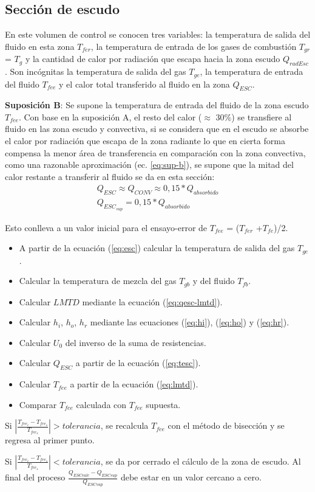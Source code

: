 \subsection{Sección de escudo}
\par En este volumen de control se conocen tres variables: la temperatura de salida del fluido en esta zona $T_{fer}$, la temperatura de entrada de los gases de combustión $T_{gr}$ = $T_g$ y la cantidad de calor por radiación que escapa hacia la zona escudo $Q_{radEsc}$. Son incógnitas la temperatura de salida del gas $T_{ge}$, la temperatura de entrada del fluido $T_{fee}$ y el calor total transferido al fluido en la zona $Q_{ESC}$.
\par \textbf{Suposición B}: Se supone la temperatura de entrada del fluido de la zona escudo $T_{fee}$. Con base en la suposición A, el resto del calor ($\approx$ 30\%) se transfiere al fluido en las zona escudo y convectiva, si se considera que en el escudo se absorbe el calor por radiación que escapa de la zona radiante lo que en cierta forma compensa la menor área de transferencia en comparación con la zona convectiva, como una razonable aproximación (ec. \ref{eq:sup-b}), se supone que la mitad del calor restante a transferir al fluido se da en esta sección:
\begin{equation}\label{eq:sup-b}\begin{gathered}
    Q_{ESC} \approx Q_{CONV} \approx 0,15 * Q_{absorbido}\\
    Q_{ESC_{sup}} = 0,15 * Q_{absorbido} 
\end{gathered}\end{equation}
\par Esto conlleva a un valor inicial para el ensayo-error de $T_{fee}$ = ($T_{fer}$ +$T_{fe}$)/2. 
\begin{itemize}
    \item A partir de la ecuación (\ref{eq:esc}) calcular la temperatura de salida del gas $T_{ge}$.
    \item Calcular la temperatura de mezcla del gas $T_{gb}$ y del fluido $T_{fb}$.
    \item Calcular $LMTD$ mediante la ecuación (\ref{eq:qesc-lmtd}).
    \item Calcular $h_i$, $h_o$, $h_r$ mediante las ecuaciones (\ref{eq:hi}), (\ref{eq:ho}) y (\ref{eq:hr}).
    \item Calcular $U_0$ del inverso de la suma de resistencias.
    \item Calcular $Q_{ESC}$ a partir de la ecuación (\ref{eq:tesc}).
    \item Calcular $T_{fee}$ a partir de la ecuación (\ref{eq:lmtd}).
    \item Comparar $T_{fee}$ calculada con $T_{fee}$ supuesta.
\end{itemize}
\par Si $|\frac{T_{fee_c} - T_{fee_s}}{T_{fee_s}}| > tolerancia$, se recalcula $T_{fee}$ con el método de bisección y se regresa al primer punto.
\par Si $|\frac{T_{fee_c} - T_{fee_s}}{T_{fee_s}} | < tolerancia$, se da por cerrado el cálculo de la zona de escudo. Al final del proceso $\frac{Q_{ESCcalc} - Q_{ESCsup}}{ Q_{ESCsup}}$ debe estar en un valor cercano a cero.

